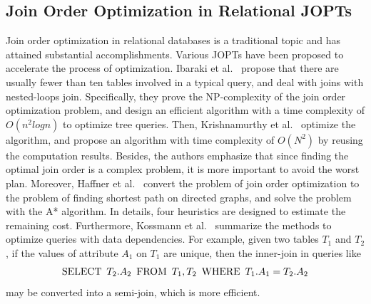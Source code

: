 \documentclass[sigconf, nonacm]{acmart}
\begin{document}
\subsection{Join Order Optimization in Relational JOPTs}
\label{sec:related-work:ropt}
Join order optimization in relational databases is a traditional topic and has attained substantial accomplishments.
Various JOPTs have been proposed to accelerate the process of optimization.
Ibaraki et al.~\cite{nested-tods-1984} propose that there are usually fewer than ten tables involved in a typical query, and deal with joins with nested-loops join.
Specifically, they prove the NP-complexity of the join order optimization problem, and design an efficient algorithm with a time complexity of $O(n^2logn)$ to optimize tree queries.
Then, Krishnamurthy et al.~\cite{optimize-nested-vldb-1986} optimize the algorithm, and propose an algorithm with time complexity of $O(N^2)$ by reusing the computation results.
Besides, the authors emphasize that since finding the optimal join order is a complex problem, it is more important to avoid the worst plan.
Moreover, Haffner et al.~\cite{astarjoin} convert the problem of join order optimization to the problem of finding shortest path on directed graphs, and solve the problem with the A* algorithm.
In details, four heuristics are designed to estimate the remaining cost.
Furthermore, Kossmann et al.~\cite{data-dependency-join} summarize the methods to optimize queries with data dependencies.
For example, given two tables $T_1$ and $T_2$, if the values of attribute $A_1$ on $T_1$ are unique, then the inner-join in queries like 
\begin{equation*}
    \text{SELECT}\hspace{.5em} T_2.A_2 \hspace{.5em}\text{FROM}\hspace{.5em} T_1, T_2 \hspace{.5em}\text{WHERE}\hspace{.5em} T_1.A_1 = T_2.A_2
\end{equation*}
may be converted into a semi-join, which is more efficient.
\end{document}
